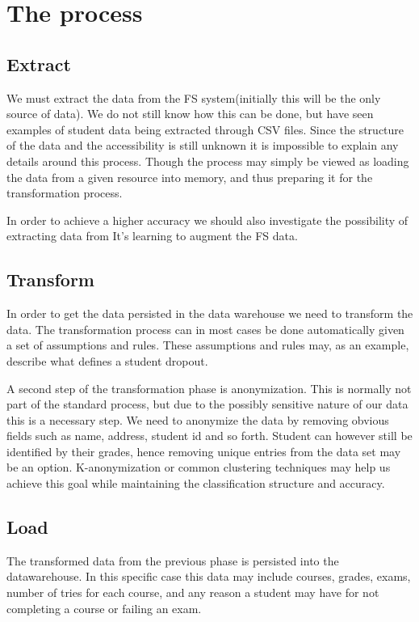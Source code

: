 \section{The process}
\subsection{Extract}
We must extract the data from the FS system(initially this will be the only source of data). We do not still know how this can be done, but have seen examples of student data being extracted through CSV files. 
Since the structure of the data and the accessibility is still unknown it is impossible to explain any details around this process.
Though the process may simply be viewed as loading the data from a given resource into memory, and thus preparing it for the transformation process.

\bigskip\noindent
In order to achieve a higher accuracy we should also investigate 
the possibility of extracting data from It's learning to augment the FS data.

\subsection{Transform}
In order to get the data persisted in the data warehouse we need to transform the data.
The transformation process can in most cases be done automatically given a set of assumptions and rules.
These assumptions and rules may, as an example, describe what defines a student dropout. 

\bigskip\noindent
A second step of the transformation phase is anonymization. 
This is normally not part of the standard process, but due to the possibly sensitive nature of our data this is a necessary step.
We need to anonymize the data by removing obvious fields such as name, address, student id and so forth. 
Student can however still be identified by their grades, hence removing unique entries from the data set may be an option.
K-anonymization or common clustering techniques may help us achieve this goal while maintaining the classification structure and accuracy.

\subsection{Load}
The transformed data from the previous phase is persisted into the datawarehouse. 
In this specific case this data may include courses, grades, exams, number of tries for each course, 
and any reason a student may have for not completing a course or failing an exam.

